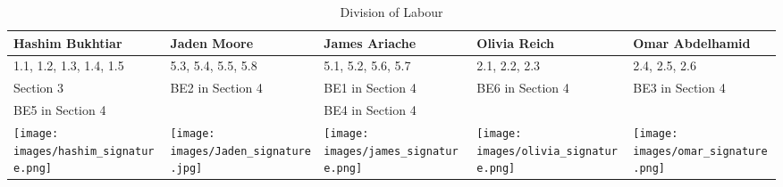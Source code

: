 \documentclass[]{article}
\begin{document}
\begin{table}[h!]
\centering
\begin{tabular}{|p{3cm}|p{3cm}|p{3cm}|p{3cm}|p{3cm}|}
\hline
Hashim Bukhtiar & Jaden Moore & James Ariache & Olivia Reich & Omar Abdelhamid \\ \hline
1.1, 1.2, 1.3, 1.4, 1.5 & 5.3, 5.4, 5.5, 5.8 & 5.1, 5.2, 5.6, 5.7 & 2.1, 2.2, 2.3 & 2.4, 2.5, 2.6 \\ 
Section 3 & BE2 in Section 4 & BE1 in Section 4 & BE6 in Section 4 & BE3 in Section 4 \\ 
BE5 in Section 4 & & BE4 in Section 4 & & \\ \hline
\texttt{[image: images/hashim\_signature.png]} & \texttt{[image: images/Jaden\_signature.jpg]} &
\texttt{[image: images/james\_signature.png]}& \texttt{[image: images/olivia\_signature.png]} & \texttt{[image: images/omar\_signature.png]}  \\
\hline
\end{tabular}
\caption{Division of Labour} 
\label{tab:division_of_labour}
\end{table}


\end{document}
